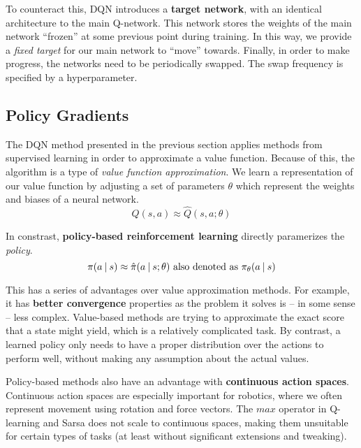 To counteract this, DQN introduces a \textbf{target network}, with an identical architecture to the main Q-network. This network stores the weights of the main network ``frozen'' at some previous point during training.
In this way, we provide a \emph{fixed target} for our main network to ``move'' towards.
Finally, in order to make progress, the networks need to be periodically swapped.
The swap frequency is specified by a hyperparameter.


\subsection{Policy Gradients} \label{section:pg}

The DQN method presented in the previous section applies methods from supervised learning in order to approximate a value function. Because of this, the algorithm is a type of \emph{value function approximation}.
We learn a representation of our value function by adjusting a set of parameters $\theta$ which represent the weights and biases of a neural network.
\begin{equation}
    Q(s, a) \approx \hat{Q}(s, a; \theta)
\end{equation}

In constrast, \textbf{policy-based reinforcement learning} directly paramerizes the \emph{policy}.
\begin{equation}
    \pi(a \:\vert\: s) \approx \hat{\pi}(a \:\vert\: s; \theta) \mbox{ also denoted as } \pi_{\theta}(a \:\vert\: s)
\end{equation}

This has a series of advantages over value approximation methods.
For example, it has \textbf{better convergence} properties as the problem it solves is -- in some sense -- less complex.
Value-based methods are trying to approximate the exact score that a state might yield, which is a relatively complicated task.
By contrast, a learned policy only needs to have a proper distribution over the actions to perform well, without making any assumption about the actual values.

Policy-based methods also have an advantage with \textbf{continuous action spaces}.
Continuous action spaces are especially important for robotics, where we often represent movement using rotation and force vectors.
The $max$ operator in Q-learning and Sarsa does not scale to continuous spaces, making them unsuitable for certain types of tasks (at least without significant extensions and tweaking).

